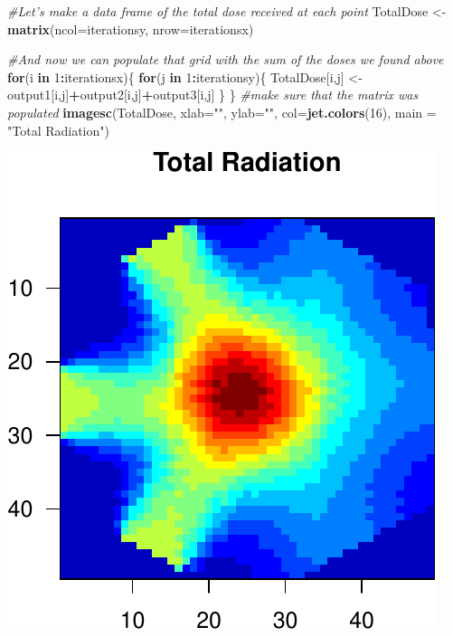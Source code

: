 \documentclass[]{article}
\newenvironment{Shaded}{\begin{snugshade}}{\end{snugshade}}
\newcommand{\KeywordTok}[1]{\textcolor[rgb]{0.13,0.29,0.53}{\textbf{#1}}}
\newcommand{\DataTypeTok}[1]{\textcolor[rgb]{0.13,0.29,0.53}{#1}}
\newcommand{\DecValTok}[1]{\textcolor[rgb]{0.00,0.00,0.81}{#1}}
\newcommand{\StringTok}[1]{\textcolor[rgb]{0.31,0.60,0.02}{#1}}
\newcommand{\CommentTok}[1]{\textcolor[rgb]{0.56,0.35,0.01}{\textit{#1}}}
\newcommand{\ControlFlowTok}[1]{\textcolor[rgb]{0.13,0.29,0.53}{\textbf{#1}}}
\newcommand{\OperatorTok}[1]{\textcolor[rgb]{0.81,0.36,0.00}{\textbf{#1}}}
\newcommand{\NormalTok}[1]{#1}
\begin{document}
\begin{Shaded}
\begin{Highlighting}[]
\CommentTok{#Let's make a data frame of the total dose received at each  point}
\NormalTok{TotalDose <-}\StringTok{ }\KeywordTok{matrix}\NormalTok{(}\DataTypeTok{ncol=}\NormalTok{iterationsy, }\DataTypeTok{nrow=}\NormalTok{iterationsx)}

\CommentTok{#And now we can populate that grid with the sum of the doses we found above}
\ControlFlowTok{for}\NormalTok{(i }\ControlFlowTok{in} \DecValTok{1}\OperatorTok{:}\NormalTok{iterationsx)\{}
  \ControlFlowTok{for}\NormalTok{(j }\ControlFlowTok{in} \DecValTok{1}\OperatorTok{:}\NormalTok{iterationsy)\{}
\NormalTok{    TotalDose[i,j] <-}\StringTok{ }\NormalTok{output1[i,j]}\OperatorTok{+}\NormalTok{output2[i,j]}\OperatorTok{+}\NormalTok{output3[i,j]}
\NormalTok{        \}}
\NormalTok{\}}
\CommentTok{#make sure that the matrix was populated}
\KeywordTok{imagesc}\NormalTok{(TotalDose, }\DataTypeTok{xlab=}\StringTok{""}\NormalTok{, }\DataTypeTok{ylab=}\StringTok{""}\NormalTok{, }\DataTypeTok{col=}\KeywordTok{jet.colors}\NormalTok{(}\DecValTok{16}\NormalTok{), }\DataTypeTok{main =} \StringTok{"Total Radiation"}\NormalTok{)}
\end{Highlighting}
\end{Shaded}

\begin{center}\includegraphics{TumourSurvival_files/figure-latex/unnamed-chunk-4-1} \end{center}
\end{document}
